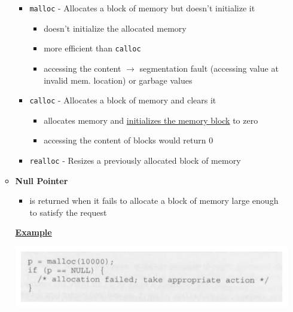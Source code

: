 \documentclass[12pt]{article}
\begin{document}
\begin{enumerate}[1.]
\begin{itemize}
        \begin{itemize}
            \item \texttt{malloc} - Allocates a block of memory but doesn't initialize it

            \begin{itemize}
                \item doesn't initialize the allocated memory
                \item more efficient than \texttt{calloc}
                \item accessing the content $\to$ segmentation fault (accessing value at invalid mem. location)
                or garbage values
            \end{itemize}

            \item \texttt{calloc} - Allocates a block of memory and clears it

            \begin{itemize}
                \item allocates memory and \underline{initializes the memory block} to zero
                \item accessing the content of blocks would return 0
            \end{itemize}

            \item \texttt{realloc} - Resizes a previously allocated block of memory
        \end{itemize}

        \item \textbf{Null Pointer}

        \begin{itemize}
            \item is returned when it fails to allocate a block of memory large
            enough to satisfy the request
        \end{itemize}

        \bigskip

        \underline{\textbf{Example}}

        \begin{center}
        \includegraphics[width=\linewidth]{images/review_8_solution_1.png}
        \end{center}
    \end{itemize}


\end{enumerate}
\end{document}
